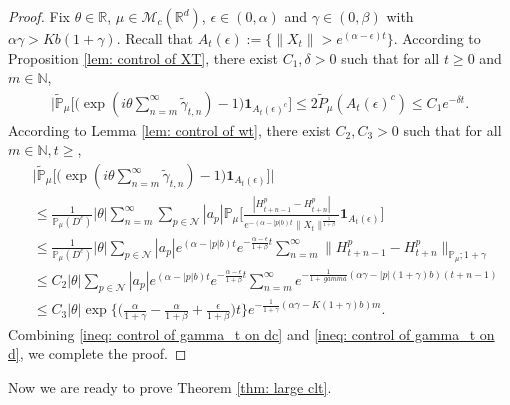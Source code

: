 \documentclass[12pt,a4paper]{amsart}
\theoremstyle{plain}
\theoremstyle{definition}
\numberwithin{equation}{section}
\begin{document}
\begin{proof}
  Fix $\theta \in \mathbb R$, $\mu \in \mathcal M_c(\mathbb R^d)$, $\epsilon \in (0,\alpha)$ and $\gamma \in (0,\beta)$ with $\alpha \gamma > Kb(1+\gamma)$.
  Recall that $A_t(\epsilon):=\{\|X_t\|> e^{(\alpha-\epsilon) t}\}$.
  According to Proposition \ref{lem: control of XT}, there exist $C_1,\delta>0$ such that for all $t\geq 0$ and $m\in \mathbb N$,
  \begin{align}
    \label{ineq: control of gamma_t on dc}
    \Big| \widetilde{\mathbb{P}}_{\mu}\Big[\big(\exp(i\theta \sum_{n=m}^{\infty}\widetilde{\gamma}_{t,n})-1\big)\mathbf{1}_{A_t(\epsilon)^c}\Big]
    \leq 2 \widetilde{P}_{\mu}(A_t(\epsilon)^c)
    \leq C_1 e^{-\delta t}.
  \end{align}
  According to Lemma \ref{lem: control of wt}, there exist $C_2,C_3>0$ such that for all $m\in \mathbb{N}, t\geq$,
  \begin{align}
  \label{ineq: control of gamma_t on d}
    & \Big|\widetilde{\mathbb{P}}_{\mu}\Big[\big(\exp(i\theta \sum_{n=m}^{\infty} \widetilde{ \gamma }_{ t, n}) - 1 \big) \mathbf{1}_{ A_t( \epsilon ) } \Big] \Big| \\
    & \leq \frac{1}{\mathbb{P}_{\mu}(D^c)}|\theta|\sum_{n=m}^{\infty}\sum_{p\in \mathcal{N}}|a_p|\mathbb{P}_{\mu}\Big[\frac{|H_{t+n-1}^p-H_{t+n}^p|}{e^{-(\alpha-|p|b)t}\|X_t\|^{\frac{1}{1+\beta}}}\mathbf{1}_{A_t(\epsilon)}\Big]\\
    & \leq  \frac{1}{\mathbb{P}_{\mu}(D^c)}|\theta|\sum_{p\in \mathcal{N}}|a_p|e^{(\alpha-|p|b)t}e^{-\frac{\alpha-\epsilon}{1+\beta}t}\sum_{n=m}^{\infty}\|H_{t+n-1}^p-H_{t+n}^p\|_{\mathbb{P}_{\mu};1+\gamma}\\
    & \leq C_2|\theta|\sum_{p\in \mathcal{N} } |a_p| e^{ ( \alpha - |p| b ) t} e^{- \frac{ \alpha - \epsilon } { 1 + \beta } t } \sum_{ n = m}^{ \infty } e^{ - \frac{ 1 }{ 1 +\ gamma} ( \alpha \gamma - | p | ( 1 + \gamma ) b ) ( t + n - 1 ) } \\
    & \leq C_3 | \theta | \exp \Big\{ \Big( \frac { \alpha } { 1 + \gamma } - \frac { \alpha } { 1 + \beta } + \frac{ \epsilon } { 1 + \beta } \Big) t \Big\}
    e^{-\frac{1}{1+\gamma}(\alpha\gamma-K(1+\gamma)b)m}.
  \end{align}
  Combining \eqref{ineq: control of gamma_t on dc} and \eqref{ineq: control of gamma_t on d}, we complete the proof.
\end{proof}
Now we are ready to prove Theorem \ref{thm: large clt}.
\end{document}
